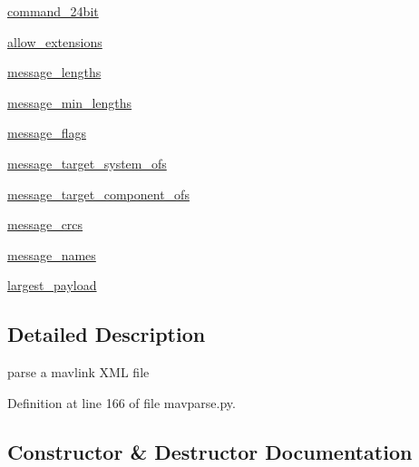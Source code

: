 \begin{DoxyCompactItemize}
\mbox{\hyperlink{classpymavlink_1_1generator_1_1mavparse_1_1MAVXML_a91bd972ccc9cca11acfccdf3c7adcd16}{command\+\_\+24bit}}
\item 
\mbox{\hyperlink{classpymavlink_1_1generator_1_1mavparse_1_1MAVXML_a76d896a773b538933a466f9481ae8b82}{allow\+\_\+extensions}}
\item 
\mbox{\hyperlink{classpymavlink_1_1generator_1_1mavparse_1_1MAVXML_af356e2918175ddc5d82b018a3e20cd35}{message\+\_\+lengths}}
\item 
\mbox{\hyperlink{classpymavlink_1_1generator_1_1mavparse_1_1MAVXML_ad2589b19168b4d725fab35ae56ad1fde}{message\+\_\+min\+\_\+lengths}}
\item 
\mbox{\hyperlink{classpymavlink_1_1generator_1_1mavparse_1_1MAVXML_ac660106001ce0e9ebf36775bbaea4d35}{message\+\_\+flags}}
\item 
\mbox{\hyperlink{classpymavlink_1_1generator_1_1mavparse_1_1MAVXML_a43bc740840f2d411588dcc2e8ab8fb17}{message\+\_\+target\+\_\+system\+\_\+ofs}}
\item 
\mbox{\hyperlink{classpymavlink_1_1generator_1_1mavparse_1_1MAVXML_ac17319f441eea0e57691c811c96c0c2c}{message\+\_\+target\+\_\+component\+\_\+ofs}}
\item 
\mbox{\hyperlink{classpymavlink_1_1generator_1_1mavparse_1_1MAVXML_ada7404f0e6690ed6678409db9d2f7129}{message\+\_\+crcs}}
\item 
\mbox{\hyperlink{classpymavlink_1_1generator_1_1mavparse_1_1MAVXML_a0ee8ced77953ec04ddbdc206d1c0c317}{message\+\_\+names}}
\item 
\mbox{\hyperlink{classpymavlink_1_1generator_1_1mavparse_1_1MAVXML_a3d5f26513d16758de8117560b60e1ff4}{largest\+\_\+payload}}
\end{DoxyCompactItemize}


\subsection{Detailed Description}
\begin{DoxyVerb}parse a mavlink XML file\end{DoxyVerb}
 

Definition at line 166 of file mavparse.\+py.



\subsection{Constructor \& Destructor Documentation}
\mbox{\label{classpymavlink_1_1generator_1_1mavparse_1_1MAVXML_aa60a4c95dd95e0b15a24e953e240e5ad}} 
